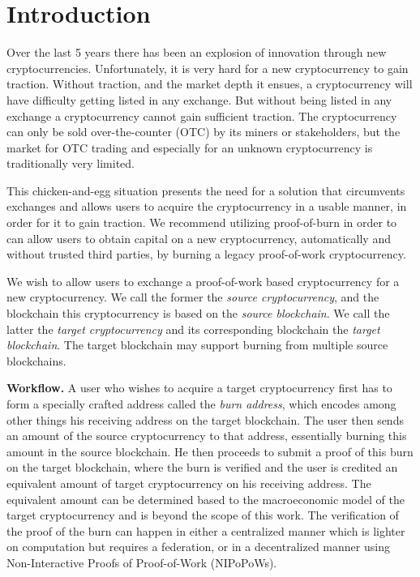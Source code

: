 \section{Introduction}

Over the last 5 years there has been an explosion of innovation through new cryptocurrencies. Unfortunately, it is very hard for a new cryptocurrency to gain traction. Without traction, and the market depth it ensues, a cryptocurrency will have difficulty getting listed in any exchange. But without being listed in any exchange a cryptocurrency cannot gain sufficient traction. The cryptocurrency can only be sold over-the-counter (OTC) by its miners or stakeholders, but the market for OTC trading and especially for an unknown cryptocurrency is traditionally very limited.

This chicken-and-egg situation presents the need for a solution that circumvents exchanges and allows users to acquire the cryptocurrency in a usable manner, in order for it to gain traction. We recommend utilizing proof-of-burn in order to can allow users to obtain capital on a new cryptocurrency, automatically and without trusted third parties, by burning a legacy proof-of-work cryptocurrency.

We wish to allow users to exchange a proof-of-work based cryptocurrency for a new cryptocurrency. We call the former the \emph{source cryptocurrency}, and the blockchain this cryptocurrency is based on the \emph{source blockchain}. We call the latter the \emph{target cryptocurrency} and its corresponding blockchain the \emph{target blockchain}. The target blockchain may support burning from multiple source blockchains.

\noindent
\textbf{Workflow.}
A user who wishes to acquire a target cryptocurrency first has to form a specially crafted address called the \emph{burn address}, which encodes among other things his receiving address on the target blockchain. The user then sends an amount of the source cryptocurrency to that address, essentially burning this amount in the source blockchain. He then proceeds to submit a proof of this burn on the target blockchain, where the burn is verified and the user is credited an equivalent amount of target cryptocurrency on his receiving address. The equivalent amount can be determined based to the macroeconomic model of the target cryptocurrency and is beyond the scope of this work. The verification of the proof of the burn can happen in either a centralized manner which is lighter on computation but requires a federation, or in a decentralized manner using Non-Interactive Proofs of Proof-of-Work (NIPoPoWs).

